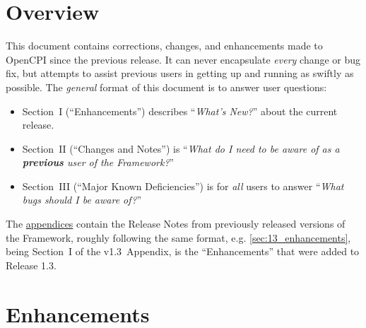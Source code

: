 \section*{Overview}
This document contains corrections, changes, and enhancements made to OpenCPI since the previous release. It can never encapsulate \textit{every} change or bug fix, but attempts to assist previous users in getting up and running as swiftly as possible. The \textit{general} format of this document is to answer user questions:
\begin{itemize}
\item Section~I (``Enhancements'') describes ``\textit{What's New?}'' about the current release.
\item Section~II (``Changes and Notes'') is ``\textit{What do I need to be aware of as a \textbf{previous} user of the Framework?}''
\item Section~III (``Major Known Deficiencies'') is for \textit{all} users to answer ``\textit{What bugs should I be aware of?}''
\end{itemize}
The \href{sec:appendices}{appendices} contain the Release Notes from previously released versions of the Framework, roughly following the same format, e.g. \ref{sec:13_enhancements}, being Section~I of the v1.3~Appendix, is the ``Enhancements'' that were added to Release 1.3.

\iffalse
\section{Enhancements}
\section{Changes and Notes}
\section{Major Known Deficiencies}
\label{sec:XX_bugs}
\subsection{Previously Documented Deficiencies}
\fi

\def\ocpiversion{latest}
\section{Enhancements}
